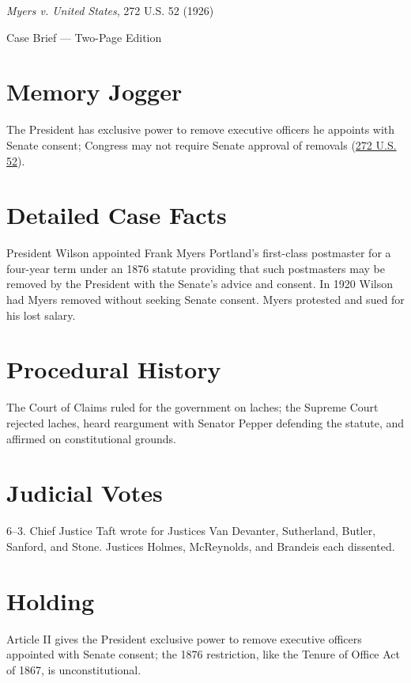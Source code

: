\documentclass[12pt]{article}
\begin{document}
\begin{center}
{\LARGE \textit{Myers v. United States}, 272 U.S. 52 (1926)\par}
\vspace{0.5em}
{\large Case Brief --- Two-Page Edition\par}
\end{center}

\section{Memory Jogger}
The President has exclusive power to remove executive officers he appoints with Senate consent; Congress may not require Senate approval of removals (\href{https://supreme.justia.com/cases/federal/us/272/52/}{272 U.S. 52}).

\section{Detailed Case Facts}
President Wilson appointed Frank Myers Portland's first-class postmaster for a four-year term under an 1876 statute providing that such postmasters may be removed by the President with the Senate's advice and consent. In 1920 Wilson had Myers removed without seeking Senate consent. Myers protested and sued for his lost salary.

\section{Procedural History}
The Court of Claims ruled for the government on laches; the Supreme Court rejected laches, heard reargument with Senator Pepper defending the statute, and affirmed on constitutional grounds.

\section{Judicial Votes}
6--3. Chief Justice Taft wrote for Justices Van Devanter, Sutherland, Butler, Sanford, and Stone. Justices Holmes, McReynolds, and Brandeis each dissented.

\section{Holding}
Article II gives the President exclusive power to remove executive officers appointed with Senate consent; the 1876 restriction, like the Tenure of Office Act of 1867, is unconstitutional.
\end{document}
